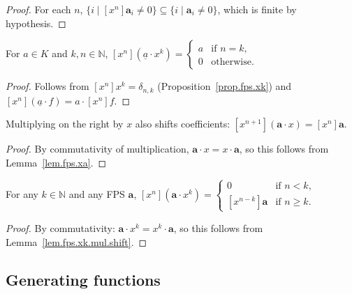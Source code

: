 \begin{proof}
\leanok
For each $n$, $\{i \mid [x^n]\mathbf{a}_i \neq 0\} \subseteq \{i \mid \mathbf{a}_i \neq 0\}$,
which is finite by hypothesis.
\end{proof}

\begin{lemma}
\label{lem.fps.coeff_monomial_X_pow}
\leanhelper
\leanok
For $a\in K$ and $k,n\in\mathbb{N}$,
$[x^n](\underline{a}\cdot x^k) = \begin{cases} a & \text{if } n = k, \\ 0 & \text{otherwise.}\end{cases}$
\end{lemma}

\begin{proof}
\leanok
Follows from $[x^n]x^k = \delta_{n,k}$ (Proposition~\ref{prop.fps.xk})
and $[x^n](\underline{a}\cdot f) = a\cdot[x^n]f$.
\end{proof}

\begin{lemma}
\label{lem.fps.mul_X_shift}
\leanhelper
\leanok
Multiplying on the right by $x$ also shifts coefficients:
$[x^{n+1}](\mathbf{a}\cdot x) = [x^n]\mathbf{a}$.
\end{lemma}

\begin{proof}
\leanok
By commutativity of multiplication, $\mathbf{a}\cdot x = x\cdot\mathbf{a}$,
so this follows from Lemma~\ref{lem.fps.xa}.
\end{proof}

\begin{lemma}
\label{lem.fps.mul_X_pow_shift}
\leanhelper
\leanok
For any $k\in\mathbb{N}$ and any FPS $\mathbf{a}$,
$[x^n](\mathbf{a}\cdot x^k) = \begin{cases} 0 & \text{if }n<k, \\ [x^{n-k}]\mathbf{a} & \text{if }n\geq k.\end{cases}$
\end{lemma}

\begin{proof}
\leanok
By commutativity: $\mathbf{a}\cdot x^k = x^k\cdot\mathbf{a}$,
so this follows from Lemma~\ref{lem.fps.xk.mul.shift}.
\end{proof}

\subsection{Generating functions}

